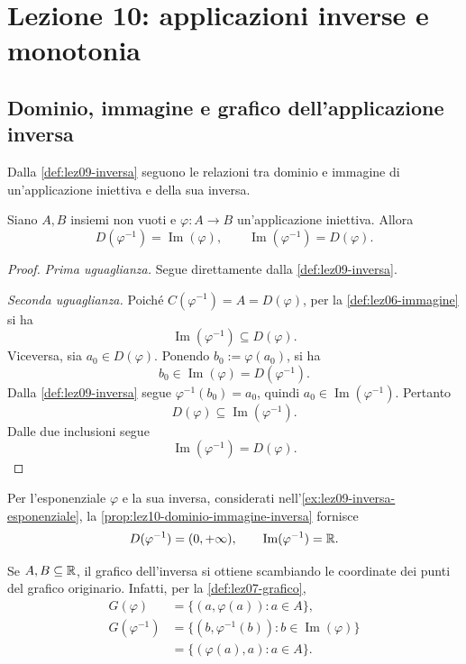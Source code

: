 \chapter[Lezione 10 --- 20 ottobre 2026]{Lezione 10: applicazioni inverse e monotonia}
\label{chap:lezione-10}

\section{Dominio, immagine e grafico dell'applicazione inversa}
\label{sec:lez10-proprieta-inversa}

Dalla \cref{def:lez09-inversa} seguono le relazioni
tra dominio e immagine di un'applicazione iniettiva e della sua inversa.

\begin{proposition}
\label{prop:lez10-dominio-immagine-inversa}
Siano \(A,B\) insiemi non vuoti e
\(\varphi\colon A\longrightarrow B\) un'applicazione iniettiva.
Allora
\[
  D(\varphi^{-1})=\operatorname{Im}(\varphi),
  \qquad
  \operatorname{Im}(\varphi^{-1})=D(\varphi).
\]
\end{proposition}

\begin{proof}
\emph{Prima uguaglianza.}
Segue direttamente dalla \cref{def:lez09-inversa}.

\emph{Seconda uguaglianza.}
Poiché \(C(\varphi^{-1})=A=D(\varphi)\), per la
\cref{def:lez06-immagine} si ha
\[
  \operatorname{Im}(\varphi^{-1})\subseteq D(\varphi).
\]
Viceversa, sia \(a_0\in D(\varphi)\).
Ponendo \(b_0:=\varphi(a_0)\), si ha
\[
  b_0\in\operatorname{Im}(\varphi)=D(\varphi^{-1}).
\]
Dalla \cref{def:lez09-inversa} segue
\(\varphi^{-1}(b_0)=a_0\), quindi
\(a_0\in\operatorname{Im}(\varphi^{-1})\).
Pertanto
\[
  D(\varphi)\subseteq\operatorname{Im}(\varphi^{-1}).
\]
Dalle due inclusioni segue
\[
  \operatorname{Im}(\varphi^{-1})=D(\varphi).
\]
\end{proof}

\begin{example}
\label{ex:lez10-dominio-immagine-logaritmo}
Per l'esponenziale \(\varphi\) e la sua inversa,
considerati nell'\cref{ex:lez09-inversa-esponenziale},
la \cref{prop:lez10-dominio-immagine-inversa} fornisce
\[
  D(\varphi^{-1})=(0,+\infty),
  \qquad
  \operatorname{Im}(\varphi^{-1})=\mathbb{R}.
\]
\end{example}

Se \(A,B\subseteq\mathbb{R}\), il grafico dell'inversa si ottiene
scambiando le coordinate dei punti del grafico originario.
Infatti, per la \cref{def:lez07-grafico},
\[
\begin{aligned}
  G(\varphi)
    &=\{(a,\varphi(a)):a\in A\},\\
  G(\varphi^{-1})
    &=\{(b,\varphi^{-1}(b)):b\in\operatorname{Im}(\varphi)\}\\
    &=\{(\varphi(a),a):a\in A\}.
\end{aligned}
\]

